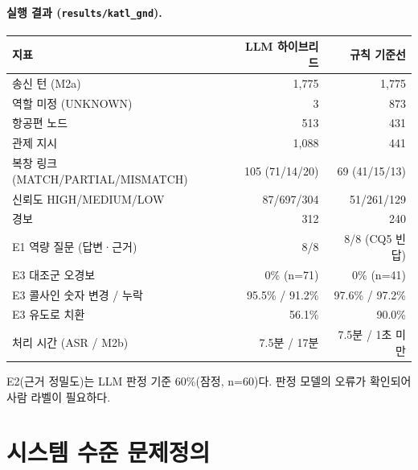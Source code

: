 \documentclass[10pt,a4paper]{article}
\begin{document}
\paragraph{실행 결과 (\texttt{results/katl\_gnd}).}
\begin{center}\small
\begin{tabular}{@{}lrr@{}}
\toprule
지표 & LLM 하이브리드 & 규칙 기준선\\\midrule
송신 턴 (M2a) & 1,775 & 1,775\\
역할 미정 (UNKNOWN) & 3 & 873\\
항공편 노드 & 513 & 431\\
관제 지시 & 1,088 & 441\\
복창 링크 (MATCH/PARTIAL/MISMATCH) & 105 (71/14/20) & 69 (41/15/13)\\
신뢰도 HIGH/MEDIUM/LOW & 87/697/304 & 51/261/129\\
경보 & 312 & 240\\
E1 역량 질문 (답변·근거) & 8/8 & 8/8 (CQ5 빈 답)\\
E3 대조군 오경보 & 0\% (n=71) & 0\% (n=41)\\
E3 콜사인 숫자 변경 / 누락 & 95.5\% / 91.2\% & 97.6\% / 97.2\%\\
E3 유도로 치환 & 56.1\% & 90.0\%\\
처리 시간 (ASR / M2b) & 7.5분 / 17분 & 7.5분 / 1초 미만\\
\bottomrule
\end{tabular}
\end{center}
E2(근거 정밀도)는 LLM 판정 기준 60\%(잠정, n=60)다. 판정 모델의 오류가 확인되어 사람 라벨이 필요하다.

\newpage

\section{시스템 수준 문제정의}
\end{document}
